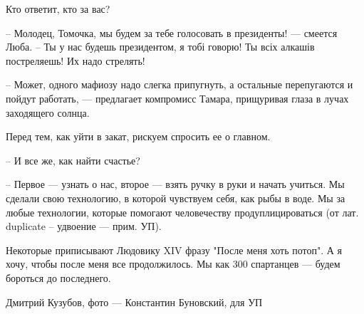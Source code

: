 Кто ответит, кто за вас?

– Молодец, Томочка, мы будем за тебе голосовать в президенты! --- смеется Люба. –
Ты у нас будешь президентом, я тобі говорю! Ты всіх алкашів постреляешь! Их
надо стрелять!

– Может, одного мафиозу надо слегка припугнуть, а остальные перепугаются и
пойдут работать, --- предлагает компромисс Тамара, прищуривая глаза в лучах
заходящего солнца.

Перед тем, как уйти в закат, рискуем спросить ее о главном.

– И все же, как найти счастье?

– Первое --- узнать о нас, второе --- взять ручку в руки и начать учиться. Мы
сделали свою технологию, в которой чувствуем себя, как рыбы в воде. Мы за любые
технологии, которые помогают человечеству продуплицироваться (от лат. duplicate
– удвоение --- прим. УП). 

Некоторые приписывают Людовику XIV фразу "После меня хоть потоп". А я хочу,
чтобы после меня все продолжилось. Мы как 300 спартанцев --- будем бороться до
последнего.

Дмитрий Кузубов, фото --- Константин Буновский, для УП
